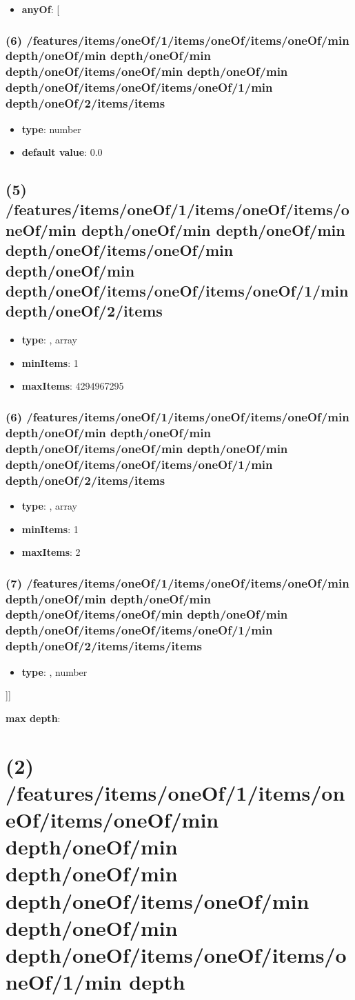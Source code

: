 \begin{itemize}[leftmargin=6em]\item {\bf anyOf}: [\end{itemize}\subsubsection{(6) /features/items/oneOf/1/items/oneOf/items/oneOf/min depth/oneOf/min depth/oneOf/min depth/oneOf/items/oneOf/min depth/oneOf/min depth/oneOf/items/oneOf/items/oneOf/1/min depth/oneOf/2/items/items}
\begin{itemize}[leftmargin=6em]\item {\bf type}: number\item {\bf default value}: 0.0
\end{itemize}\subsection{(5) /features/items/oneOf/1/items/oneOf/items/oneOf/min depth/oneOf/min depth/oneOf/min depth/oneOf/items/oneOf/min depth/oneOf/min depth/oneOf/items/oneOf/items/oneOf/1/min depth/oneOf/2/items}
\begin{itemize}[leftmargin=5em]\item {\bf type}: , array\item {\bf minItems}: 1
\item {\bf maxItems}: 4294967295
\end{itemize}\subsubsection{(6) /features/items/oneOf/1/items/oneOf/items/oneOf/min depth/oneOf/min depth/oneOf/min depth/oneOf/items/oneOf/min depth/oneOf/min depth/oneOf/items/oneOf/items/oneOf/1/min depth/oneOf/2/items/items}
\begin{itemize}[leftmargin=6em]\item {\bf type}: , array\item {\bf minItems}: 1
\item {\bf maxItems}: 2
\end{itemize}\subsubsection{(7) /features/items/oneOf/1/items/oneOf/items/oneOf/min depth/oneOf/min depth/oneOf/min depth/oneOf/items/oneOf/min depth/oneOf/min depth/oneOf/items/oneOf/items/oneOf/1/min depth/oneOf/2/items/items/items}
\begin{itemize}[leftmargin=7em]\item {\bf type}: , number\end{itemize}]]\item {\bf max depth}: \section{(2) /features/items/oneOf/1/items/oneOf/items/oneOf/min depth/oneOf/min depth/oneOf/min depth/oneOf/items/oneOf/min depth/oneOf/min depth/oneOf/items/oneOf/items/oneOf/1/min depth}
